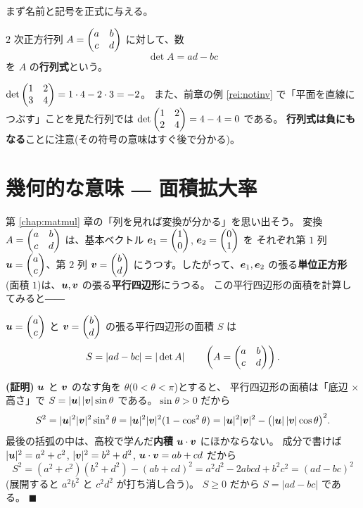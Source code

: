 まず名前と記号を正式に与える。

\begin{teigi}[$2$ 次の行列式]\label{def:det2}
$2$ 次正方行列 $A = \begin{pmatrix}a & b \\ c & d\end{pmatrix}$ に対して、数
\[
\det A = ad - bc
\]
を $A$ の\textbf{行列式}という。
\end{teigi}

\begin{rei}
$\det \begin{pmatrix}1 & 2 \\ 3 & 4\end{pmatrix} = 1 \cdot 4 - 2 \cdot 3 = -2$。
また、前章の例 \ref{rei:notinv} で「平面を直線につぶす」ことを見た行列では
$\det \begin{pmatrix}1 & 2 \\ 2 & 4\end{pmatrix} = 4 - 4 = 0$ である。
\textbf{行列式は負にもなる}ことに注意(その符号の意味はすぐ後で分かる)。
\end{rei}

\section{幾何的な意味 ― 面積拡大率}

第 \ref{chap:matmul} 章の「列を見れば変換が分かる」を思い出そう。
変換 $A = \begin{pmatrix}a & b \\ c & d\end{pmatrix}$ は、基本ベクトル
$\bm{e}_1 = \begin{pmatrix}1 \\ 0\end{pmatrix}$, $\bm{e}_2 = \begin{pmatrix}0 \\ 1\end{pmatrix}$ を
それぞれ第 $1$ 列 $\bm{u} = \begin{pmatrix}a \\ c\end{pmatrix}$、第 $2$ 列 $\bm{v} = \begin{pmatrix}b \\ d\end{pmatrix}$
にうつす。したがって、$\bm{e}_1, \bm{e}_2$ の張る\textbf{単位正方形}
(面積 $1$)は、$\bm{u}, \bm{v}$ の張る\textbf{平行四辺形}にうつる。
この平行四辺形の面積を計算してみると――

\begin{teiri}[平行四辺形の面積]\label{thm:det-area}
$\bm{u} = \begin{pmatrix}a \\ c\end{pmatrix}$ と $\bm{v} = \begin{pmatrix}b \\ d\end{pmatrix}$ の張る平行四辺形の面積
$S$ は
\[
S = |ad - bc| = |\det A| \qquad
\left(A = \begin{pmatrix}a & b \\ c & d\end{pmatrix}\right).
\]
\end{teiri}

\noindent\textbf{(証明)}\quad
$\bm{u}$ と $\bm{v}$ のなす角を $\theta$($0 < \theta < \pi$)とすると、
平行四辺形の面積は「底辺 $\times$ 高さ」で
$S = |\bm{u}|\,|\bm{v}| \sin\theta$ である。$\sin\theta > 0$ だから
\[
S^2 = |\bm{u}|^2 |\bm{v}|^2 \sin^2\theta
= |\bm{u}|^2 |\bm{v}|^2 (1 - \cos^2\theta)
= |\bm{u}|^2 |\bm{v}|^2 - \bigl(|\bm{u}|\,|\bm{v}| \cos\theta\bigr)^2.
\]
最後の括弧の中は、高校で学んだ\textbf{内積} $\bm{u} \cdot \bm{v}$ にほかならない。
成分で書けば $|\bm{u}|^2 = a^2 + c^2$, $|\bm{v}|^2 = b^2 + d^2$,
$\bm{u} \cdot \bm{v} = ab + cd$ だから
\[
S^2 = (a^2 + c^2)(b^2 + d^2) - (ab + cd)^2
= a^2 d^2 - 2abcd + b^2 c^2 = (ad - bc)^2
\]
(展開すると $a^2b^2$ と $c^2d^2$ が打ち消し合う)。
$S \ge 0$ だから $S = |ad - bc|$ である。 $\blacksquare$

